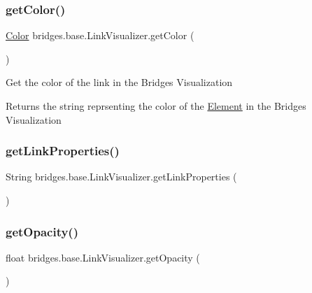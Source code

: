 \subsubsection{\texorpdfstring{get\+Color()}{getColor()}}
{\footnotesize\ttfamily \hyperlink{classbridges_1_1base_1_1_color}{Color} bridges.\+base.\+Link\+Visualizer.\+get\+Color (\begin{DoxyParamCaption}{ }\end{DoxyParamCaption})}

Get the color of the link in the Bridges Visualization \begin{DoxyReturn}{Returns}
the string reprsenting the color of the \hyperlink{classbridges_1_1base_1_1_element}{Element} in the Bridges Visualization 
\end{DoxyReturn}
\hypertarget{classbridges_1_1base_1_1_link_visualizer_ab64d9b7e2b99f7ebce80cbabfe4adf2a}{}\label{classbridges_1_1base_1_1_link_visualizer_ab64d9b7e2b99f7ebce80cbabfe4adf2a} 
\subsubsection{\texorpdfstring{get\+Link\+Properties()}{getLinkProperties()}}
{\footnotesize\ttfamily String bridges.\+base.\+Link\+Visualizer.\+get\+Link\+Properties (\begin{DoxyParamCaption}{ }\end{DoxyParamCaption})}

\hypertarget{classbridges_1_1base_1_1_link_visualizer_a07cdd435a54e4b612ad63614f2a27a4a}{}\label{classbridges_1_1base_1_1_link_visualizer_a07cdd435a54e4b612ad63614f2a27a4a} 
\subsubsection{\texorpdfstring{get\+Opacity()}{getOpacity()}}
{\footnotesize\ttfamily float bridges.\+base.\+Link\+Visualizer.\+get\+Opacity (\begin{DoxyParamCaption}{ }\end{DoxyParamCaption})}

